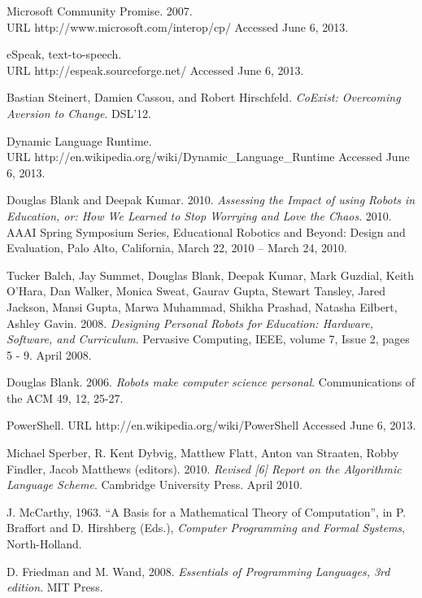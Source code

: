 \documentclass[preprint]{sigplanconf}
\begin{document}
\begin{thebibliography}{}
 Microsoft Community Promise. 2007.\\
URL http://www.microsoft.com/interop/cp/ Accessed June 6, 2013.

 eSpeak, text-to-speech.\\ URL http://espeak.sourceforge.net/ Accessed June 6, 2013.

 Bastian Steinert, Damien Cassou, and
  Robert Hirschfeld. \textit{CoExist: Overcoming Aversion to
    Change}. DSL'12.

 Dynamic Language Runtime.\\ URL
  http://en.wikipedia.org/wiki/Dynamic\_Language\_Runtime Accessed
  June 6, 2013.

 Douglas Blank and Deepak
  Kumar. 2010. \textit{Assessing the Impact of using Robots in
    Education, or: How We Learned to Stop Worrying and Love the
    Chaos}. 2010. AAAI Spring Symposium Series, Educational Robotics
  and Beyond: Design and Evaluation, Palo Alto, California, March 22,
  2010 – March 24, 2010.

 Tucker Balch, Jay Summet, Douglas Blank, Deepak Kumar,
  Mark Guzdial, Keith O'Hara, Dan Walker, Monica Sweat, Gaurav Gupta,
  Stewart Tansley, Jared Jackson, Mansi Gupta, Marwa Muhammad, Shikha
  Prashad, Natasha Eilbert, Ashley Gavin. 2008. \textit{Designing
    Personal Robots for Education: Hardware, Software, and
    Curriculum}. Pervasive Computing, IEEE, volume 7, Issue 2, pages 5
  - 9. April 2008.

 Douglas Blank. 2006. \textit{Robots make computer science
  personal}. Communications of the ACM 49, 12, 25-27.

 PowerShell. URL http://en.wikipedia.org/wiki/PowerShell Accessed June 6, 2013.

 Michael Sperber, R. Kent Dybvig, Matthew
  Flatt, Anton van Straaten, Robby Findler, Jacob Matthews
  (editors). 2010. \textit{Revised [6] Report on the Algorithmic Language
  Scheme}. Cambridge University Press. April 2010.

 J. McCarthy, 1963. ``A Basis for a Mathematical Theory
  of Computation'', in P. Braffort and D. Hirshberg (Eds.),
  \emph{Computer Programming and Formal Systems}, North-Holland.

 D. Friedman and M. Wand, 2008. \emph{Essentials of
  Programming Languages, 3rd edition}. MIT Press.


\end{thebibliography}
\end{document}

